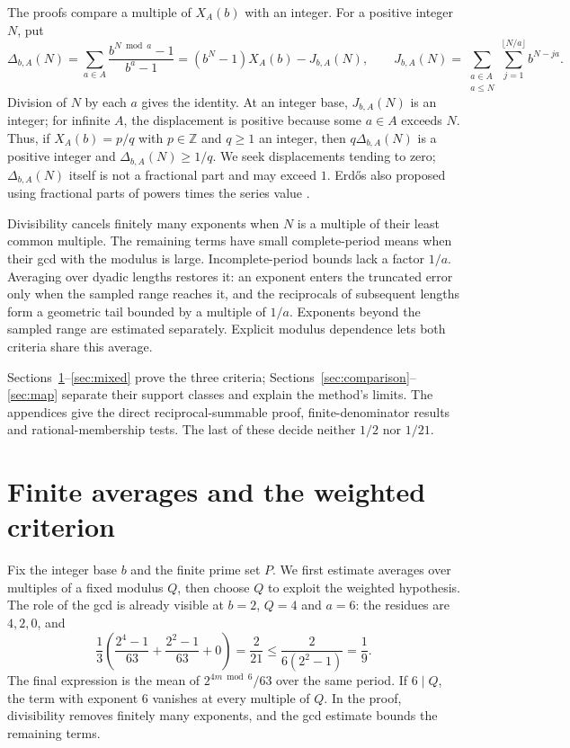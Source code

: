 \documentclass[11pt]{article}
\begin{document}
The proofs compare a multiple of $X_A(b)$ with an integer. For a
positive integer $N$, put
\begin{equation}
 \Delta_{b,A}(N)=\sum_{a\in A}\frac{b^{N\bmod a}-1}{b^a-1}
 =(b^N-1)X_A(b)-J_{b,A}(N),\qquad
 J_{b,A}(N)=\sum_{\substack{a\in A\\a\le N}}
             \sum_{j=1}^{\lfloor N/a\rfloor}b^{N-ja}.
 \label{eq:intro-displacement}\tag{D}
\end{equation}
Division of $N$ by each $a$ gives the identity. At an integer base,
$J_{b,A}(N)$ is an integer; for infinite $A$, the displacement is
positive because some $a\in A$ exceeds $N$. Thus, if $X_A(b)=p/q$
with $p\in\mathbb Z$ and $q\ge1$ an integer, then
$q\Delta_{b,A}(N)$ is a positive integer and
$\Delta_{b,A}(N)\ge1/q$. We seek displacements tending to zero;
$\Delta_{b,A}(N)$ itself is not a fractional part and may exceed $1$.
Erd\H{o}s also proposed using fractional parts of powers times the series
value \cite[p.~226]{erdos1968}.

Divisibility cancels finitely many exponents when $N$ is a multiple of
their least common multiple. The remaining terms have small
complete-period means when their gcd with the modulus is large.
Incomplete-period bounds lack a factor $1/a$. Averaging over dyadic
lengths restores it: an exponent enters the truncated error only when
the sampled range reaches it, and the reciprocals of subsequent lengths
form a geometric tail bounded by a multiple of $1/a$. Exponents beyond
the sampled range are estimated separately. Explicit modulus dependence
lets both criteria share this average.

Sections~\ref{sec:eight-return-extensions}--\ref{sec:mixed} prove the
three criteria; Sections~\ref{sec:comparison}--\ref{sec:map} separate
their support classes and explain the method's limits. The appendices
give the direct reciprocal-summable proof, finite-denominator results
and rational-membership tests. The last of these decide neither $1/2$
nor $1/21$.

\section{Finite averages and the weighted criterion}
\label{sec:eight-return-extensions}
Fix the integer base $b$ and the finite prime set $P$. We first estimate
averages over multiples of a fixed modulus $Q$, then choose $Q$ to
exploit the weighted hypothesis. The role of the gcd is already visible
at $b=2$, $Q=4$ and $a=6$: the residues are $4,2,0$, and
\[
 \frac13\left(\frac{2^4-1}{63}+\frac{2^2-1}{63}+0\right)
 =\frac2{21}\le\frac{2}{6(2^2-1)}=\frac19.
\]
The final expression is the mean of $2^{4m\bmod6}/63$ over the same
period. If $6\mid Q$, the term with exponent $6$ vanishes at every
multiple of $Q$. In the proof, divisibility removes finitely many
exponents, and the gcd estimate bounds the remaining terms.
\end{document}
